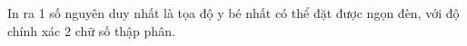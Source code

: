 In ra 1 số nguyên duy nhất là tọa độ y bé nhất có thể đặt được ngọn đèn, với độ chính xác 2 chữ số thập phân.